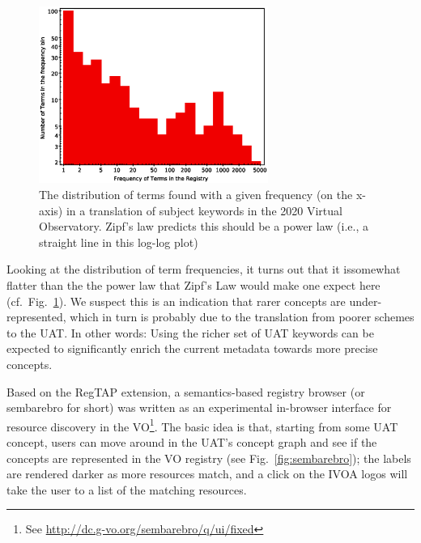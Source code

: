 \documentclass[11pt,a4paper]{ivoa}
\begin{document}
\begin{figure}
\includegraphics[width=7.5cm]{freqfreq.eps}
\caption{The distribution of terms found with a given frequency (on the
x-axis) in a translation of subject keywords in the 2020 Virtual
Observatory.  Zipf's law predicts this should be a power law (i.e., a
straight line in this log-log plot)}
\label{fig:freqfreq}
\end{figure}

Looking at the distribution of term frequencies, it turns out 
that it issomewhat flatter than the
the power law that Zipf's Law \citep{book:manning} would make one expect
here (cf.~Fig.~\ref{fig:freqfreq}).  We suspect this is an indication
that rarer concepts are under-represented, which in turn is probably due
to the translation from poorer schemes to the UAT.  In other words:
Using the richer set of UAT keywords can be expected to significantly
enrich the current metadata towards more precise concepts.

Based on the RegTAP extension, a semantics-based 
registry browser (or sembarebro for
short) was written as an experimental in-browser interface for resource
discovery in the VO\footnote{See
\url{http://dc.g-vo.org/sembarebro/q/ui/fixed}}.  The basic idea is
that, starting from some UAT concept, users can move around in the
UAT's concept graph and see if the concepts are represented in the VO
registry (see Fig.~\ref{fig:sembarebro}); the labels are 
rendered darker as more
resources match, and a click on the IVOA logos will take the user to a
list of the matching resources.
\end{document}
